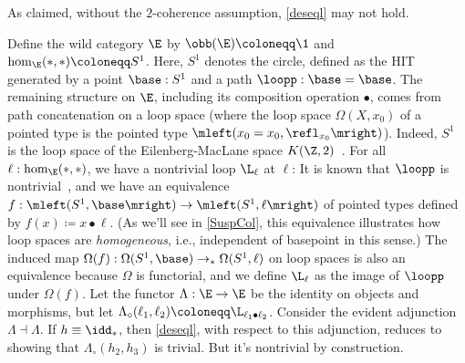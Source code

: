 \begin{exa} \label{eq-counter}
As claimed, without the $2$-coherence assumption, \eqref{deseql} may not hold. 

Define the wild category $\E$ by $\obb(\E) \coloneqq \1$ and $\hom_{\E}(\ast, \ast) \coloneqq S^1$. Here, $S^1$ denotes the circle, defined as the HIT generated by 
a point $\base : S^1$ and a path $\loopp : \base = \base$. The remaining structure on $\E$, including its composition operation $\bullet$, comes from path concatenation on a loop space (where the loop space $\Omega(X,x_0)$ of a pointed type is the pointed type $\mleft(x_0=x_0, \refl_{x_0}\mright)$). Indeed, $S^1$ is the loop space of the Eilenberg-MacLane space $K(\Z, 2)$~\cite{EMS}. For all $\ell : \hom_{\E}(\ast, \ast)$, we have a nontrivial loop $\L_{\ell}$ at $\ell$: It is known that $\loopp$ is nontrivial~\cite[Lemma 6.4.1]{Uni13}, and we have an equivalence $f : \mleft(S^1, \base \mright) \to \mleft(S^1 , \ell\mright)$ of pointed types defined by $f(x) \coloneqq x \bullet \ell$. (As we'll see in \cref{SuspCol}, this equivalence illustrates how loop spaces are \emph{homogeneous}, i.e., independent of basepoint in this sense.) The induced map $\Omega(f) : \Omega(S^1, \base) \to_{\ast} \Omega(S^1,\ell) $ on loop spaces is also an equivalence because $\Omega$ is functorial, and we define $\L_{\ell}$ as the image of $\loopp$ under $\Omega(f)$.
Let the functor $\Lambda : \E \to \E$ be the identity on objects and morphisms, but let $\Lambda_{\circ}(\ell_1, \ell_2) \coloneqq \L_{\ell_1 \bullet \ell_2}$.
Consider the evident adjunction $\Lambda \dashv \Lambda$. If $h \equiv \idd_{\ast}$, then \eqref{deseql}, with respect to this adjunction, reduces to showing that $\Lambda_{\circ} (h_2, h_3)$ is trivial. But it's nontrivial by construction.
\end{exa}


